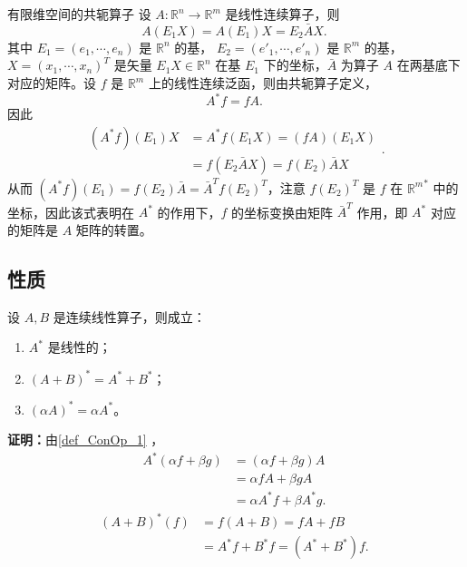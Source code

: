 \begin{example}{有限维空间的共轭算子}
设 $A:\mathbb R^n\rightarrow\mathbb R^m$ 是线性连续算子，则 
\begin{equation}
A(E_1 X)=A(E_1)X=E_2 \bar AX.~
\end{equation}
其中 $E_1=(e_1,\cdots,e_n)$ 是 $\mathbb R^n$ 的基， $E_2=(e'_1,\cdots,e'_n)$ 是 $\mathbb R^m$ 的基，$X=(x_1,\cdots,x_n)^T$ 是矢量 $E_1X\in\mathbb R^n$ 在基 $E_1$ 下的坐标，$\bar A$ 为算子 $A$ 在两基底下对应的矩阵。设 $f$ 是 $\mathbb R^m$ 上的线性连续泛函，则由共轭算子定义，
\begin{equation}
A^*f=fA.~
\end{equation}
因此
\begin{equation}
\begin{aligned}
(A^*f)(E_1)X&=A^*f(E_1X)=(fA)(E_1X)\\
&=f(E_2 \bar AX)=f(E_2)\bar AX
\end{aligned}.~
\end{equation}
从而 $(A^*f)(E_1)=f(E_2)\bar A=\bar A^T f(E_2)^T$，注意 $f(E_2)^T$ 是 $f$ 在 ${\mathbb R^m}^*$ 中的坐标，因此该式表明在 $A^*$ 的作用下，$f$ 的坐标变换由矩阵 $\bar A^T$ 作用，即 $A^*$ 对应的矩阵是 $A$ 矩阵的转置。

\end{example}


\subsection{性质}

\begin{theorem}{}
设 $A,B$ 是连续线性算子，则成立：
\begin{enumerate}
\item $A^*$ 是线性的；
\item $(A+B)^*=A^*+B^*$；
\item $(\alpha A)^*=\alpha A^*$。
\end{enumerate}

\end{theorem}

\textbf{证明：}由\autoref{def_ConOp_1} ，
\begin{equation}
\begin{aligned}
A^*(\alpha f+\beta g)&=(\alpha f+\beta g)A\\
&=\alpha fA+\beta gA\\
&=\alpha A^*f+\beta A^*g.
\end{aligned}~
\end{equation}
\begin{equation}
\begin{aligned}
(A+B)^*(f)&=f(A+B)=fA+fB\\
&=A^*f+B^*f=(A^*+B^*)f.
\end{aligned}~
\end{equation}

